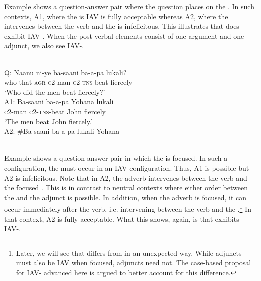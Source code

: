 \documentclass[output=paper,newtxmath,modfonts,nonflat,hidelinks]{langsci/langscibook}
\begin{document}
Example  shows a question-answer pair where the question places  on the . In such contexts, A1, where the  is IAV is fully acceptable whereas A2, where the  intervenes between the verb and the  is infelicitous. This illustrates that  does exhibit IAV-. When the post-verbal elements consist of one argument and one adjunct, we also see IAV-.

\ea\label{ex:selvanathan:7}
\\

Q: 
\gll Naanu  ni-ye    ba-saani   ba-a-pa     lukali?\\
who  that-\textsc{agr}   \textsc{c}2-man   \textsc{c}2-\textsc{tns}{}-beat  fiercely\\

\glt \-\hspace{0.5cm}`Who did the men beat fiercely?'\\

A1: 
{\gll Ba-saani  ba-a-pa  Yohana      lukali \\
	\textsc{c}2-man   \textsc{c}2-\textsc{tns}{}-beat  John          fiercely\\}
\glt \-\hspace{0.5cm}`The men beat John fiercely.'\\

A2:
{\gll \#Ba-saani  ba-a-pa  lukali        Yohana  \\
                            \\}
\z

Example  shows a question-answer pair in which the  is focused. In such a configuration, the  must occur in an IAV configuration. Thus, A1 is possible but A2 is infelicitous. Note that in A2, the adverb intervenes between the verb and the focused . This is in contrast to neutral contexts where either order between the  and the adjunct is possible. In addition, when the adverb is focused, it can occur immediately after the verb, i.e. intervening between the verb and the .\footnote{Later, we will see that  differs from  in an unexpected way. While  adjuncts must also be IAV when focused,  adjuncts need not. The case-based proposal for IAV- advanced here is argued to better account for this difference.}  In that context, A2 is fully acceptable. What this shows, again, is that  exhibits IAV-.
\end{document}
